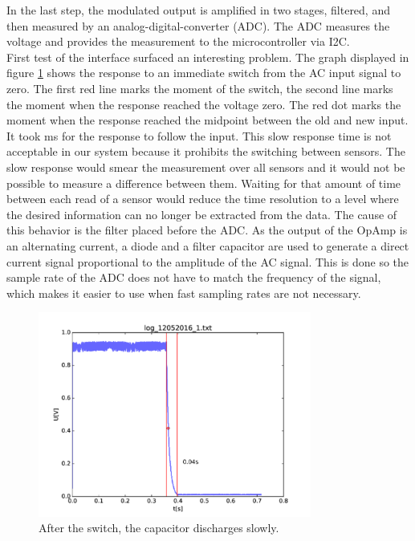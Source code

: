 In the last step, the modulated output is amplified in two stages, filtered, and then measured by an analog-digital-converter (ADC). The ADC measures the voltage and provides the measurement to the microcontroller via I2C.\\

First test of the interface surfaced an interesting problem. The graph displayed in figure \ref{fig:swcap} shows the response to an immediate switch from the AC input signal to zero. The first red line marks the moment of the switch, the second line marks the moment when the response reached the voltage zero. The red dot marks the moment when the response reached the midpoint between the old and new input. It took \unit[40]{ms} for the response to follow the input. This slow response time is not acceptable in our system because it prohibits the switching between sensors. The slow response would smear the measurement over all sensors and it would not be possible to measure a difference between them. Waiting for that amount of time between each read of a sensor would reduce the time resolution to a level where the desired information can no longer be extracted from the data. The cause of this behavior is the filter placed before the ADC. As the output of the OpAmp is an alternating current, a diode and a filter capacitor are used to generate a direct current signal proportional to the amplitude of the AC signal. This is done so the sample rate of the ADC does not have to match the frequency of the signal, which makes it easier to use when fast sampling rates are not necessary.\\

\begin{figure}
	\begin{center}
		\includegraphics[width=0.8\textwidth]{images/switch_cap.pdf} 
		\caption{After the switch, the capacitor discharges slowly.}
		\label{fig:swcap}
	\end{center}
\end{figure}

